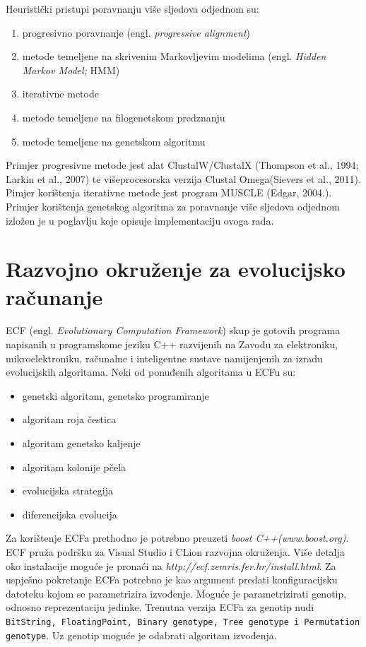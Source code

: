 \documentclass[times, utf8, zavrsni, numeric]{fer}
\begin{document}
Heuristički pristupi poravnanju više sljedova odjednom su:
\begin{enumerate}
	\item progresivno poravnanje (engl. \textit{progressive alignment})
	\item metode temeljene na skrivenim Markovljevim modelima (engl. \textit{Hidden Markov Model;} HMM)
	\item iterativne metode
	\item metode temeljene na filogenetskom predznanju
	\item metode temeljene na genetskom algoritmu
\end{enumerate}

Primjer progresivne metode jest alat ClustalW/ClustalX (Thompson et al., 1994; Larkin et al., 2007) te višeprocesorska verzija Clustal Omega(Sievers et al., 2011). Pimjer korištenja iterativne metode jest program MUSCLE (Edgar, 2004.). Primjer korištenja genetskog algoritma za poravnanje više sljedova odjednom izložen je u poglavlju koje opisuje implementaciju ovoga rada.

\renewcommand{\lstlistingname}{Isječak koda}
\lstset{language=C++, tabsize=2, numbers = left, stepnumber=1, showstringspaces=false, basicstyle=\footnotesize}
\chapter{Razvojno okruženje za evolucijsko računanje}
\label{ecf}
ECF (engl. \textit{Evolutionary Computation Framework}) skup je gotovih programa napisanih u programskome jeziku C++ razvijenih na Zavodu za elektroniku, mikroelektroniku, računalne i inteligentne sustave namijenjenih za izradu evolucijskih algoritama.
Neki od ponuđenih algoritama u ECFu su:
\begin{itemize}
	\item genetski algoritam, genetsko programiranje
	\item algoritam roja čestica
	\item algoritam genetsko kaljenje
	\item algoritam kolonije pčela
	\item evolucijska strategija
	\item diferencijska evolucija
\end{itemize}

Za korištenje ECFa prethodno je potrebno preuzeti \textit{boost C++(www.boost.org)}. ECF pruža podršku za Visual Studio i CLion razvojna okruženja. Više detalja oko instalacije moguće je pronaći na \textit{http://ecf.zemris.fer.hr/install.html}.
Za uspješno pokretanje ECFa potrebno je kao argument predati konfiguracijsku datoteku kojom se parametrizira izvođenje. Moguće je parametrizirati genotip, odnosno reprezentaciju jedinke. Trenutna verzija ECFa za genotip nudi \texttt{BitString, FloatingPoint, Binary genotype,  Tree genotype i Permutation genotype}. Uz genotip moguće je odabrati algoritam izvođenja. 
\end{document}
